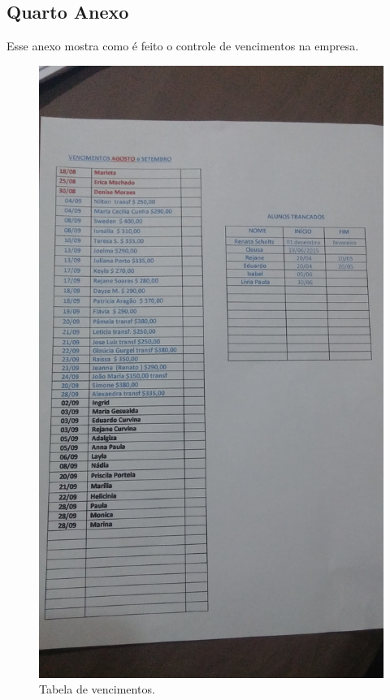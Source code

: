 \begin{anexosenv}
\chapter{Quarto Anexo}
Esse anexo mostra como é feito o controle de vencimentos na empresa.
\begin{figure}[h!]
    \centering
    \includegraphics[width=\textwidth, angle=-90]{figuras/vencimentos.jpg}
    \caption{Tabela de vencimentos.}
    \label{fig:vencimentos}
\end{figure}
\end{anexosenv}
